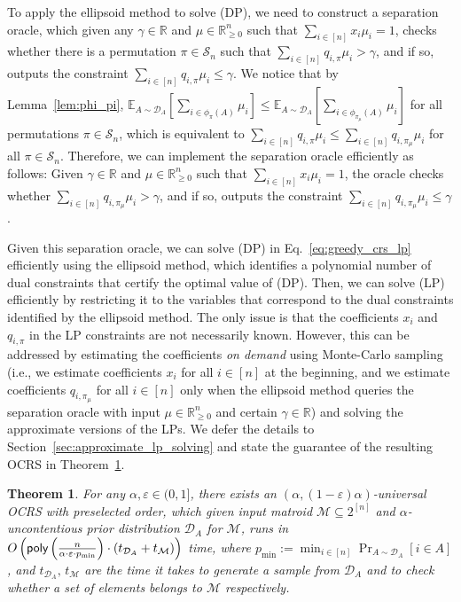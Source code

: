 \documentclass[11pt]{article}
\newcommand{\D}{\mathcal D}
\def \E {\mathbb{E}}
\newcommand{\M}{{\mathcal M}}
\newcommand{\cS}{{\mathcal S}}
\newcommand{\eps}{\varepsilon}
\newcommand{\poly}{\textnormal{\sffamily poly}}
\newcommand{\R}{{\mathbb R}}
\newtheorem{theorem}{Theorem}[section]
\begin{document}
To apply the ellipsoid method to solve (DP), we need to construct a separation oracle, which given any $\gamma\in\R$ and $\mu\in\R_{\ge0}^n$ such that $\sum_{i\in[n]}x_i\mu_i=1$, checks whether there is a permutation $\pi\in\cS_n$ such that $\sum_{i\in[n]} q_{i,\pi}\mu_i>\gamma$, and if so, outputs the constraint $\sum_{i\in[n]} q_{i,\pi}\mu_i\le\gamma$. We notice that by Lemma~\ref{lem:phi_pi}, $\E_{A\sim\D_A}[\sum_{i\in\phi_{\pi}(A)} \mu_i]\le\E_{A\sim\D_A}[\sum_{i\in\phi_{\pi_{\mu}}(A)} \mu_i]$ for all permutations $\pi\in\cS_n$, which is equivalent to $\sum_{i\in[n]} q_{i,\pi}\mu_i\le\sum_{i\in[n]} q_{i,\pi_{\mu}}\mu_i$ for all $\pi\in\cS_n$. Therefore, we can implement the separation oracle efficiently as follows: Given $\gamma\in\R$ and $\mu\in\R_{\ge0}^n$ such that $\sum_{i\in[n]}x_i\mu_i=1$, the oracle checks whether $\sum_{i\in[n]} q_{i,\pi_{\mu}}\mu_i>\gamma$, and if so, outputs the constraint $\sum_{i\in[n]} q_{i,\pi_{\mu}}\mu_i\le\gamma$.

Given this separation oracle, we can solve (DP) in Eq.~\eqref{eq:greedy_crs_lp} efficiently using the ellipsoid method, which identifies a polynomial number of dual constraints that certify the optimal value of (DP). Then, we can solve (LP) efficiently by restricting it to the variables that correspond to the dual constraints identified by the ellipsoid method. The only issue is that the coefficients $x_i$ and $q_{i,\pi}$ in the LP constraints are not necessarily known. However, this can be addressed by estimating the coefficients \emph{on demand} using Monte-Carlo sampling (i.e., we estimate coefficients $x_i$ for all $i\in[n]$ at the beginning, and we estimate coefficients $q_{i,\pi_{\mu}}$ for all $i\in[n]$ only when the ellipsoid method queries the separation oracle with input $\mu\in\R_{\ge0}^n$ and certain $\gamma\in\R$) and solving the approximate versions of the LPs. We defer the details to Section~\ref{sec:approximate_lp_solving} and state the guarantee of the resulting OCRS in Theorem~\ref{thm:universal_ocrs_linear_programming}.
\begin{theorem}\label{thm:universal_ocrs_linear_programming}
For any $\alpha,\eps\in(0,1]$, there exists an $(\alpha,(1-\eps)\alpha)$-universal OCRS with preselected order, which given input matroid $\M\subseteq2^{[n]}$ and $\alpha$-uncontentious prior distribution $\D_A$ for $\M$, runs in $O\left(\poly\left(\frac{n}{\alpha\cdot\eps\cdot p_{\min}}\right)\cdot(t_{\D_A}+t_{\M})\right)$ time, where $p_{\min}:=\min_{i\in[n]}\Pr_{A\sim\D_A}[i\in A]$, and $t_{\D_A},\,t_{\M}$ are the time it takes to generate a sample from $\D_A$ and to check whether a set of elements belongs to $\M$ respectively.
\end{theorem} 
\end{document}

